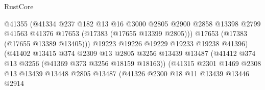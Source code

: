 \begin{lexlean}{RustCore}
\begin{coremodule}
                                            @41355
                                            (@41334
                                              @237
                                              @182
                                              @13
                                              @16
                                              @3000
                                              @2805
                                              @2900
                                              @2858
                                              @13398
                                              @2799
                                              @41563
                                              @41376
                                              @17653
                                              (@17383 (@17655 @13399 @2805)))
                                            @17653
                                            (@17383 (@17655 @13389 @13405)))
                                          @19223
                                          @19226
                                          @19229
                                          @19233
                                          @19238
                                          @41396)
                                        (@41402
                                          @13415
                                          @374
                                          @2309
                                          @13
                                          @2805
                                          @3256
                                          @13439
                                          @13487
                                          (@41412 @374 @13 @3256 (@41369 @373 @3256 @18159 @18163))
                                          (@41315
                                            @2301
                                            @1469
                                            @2308
                                            @13
                                            @13439
                                            @13448
                                            @2805
                                            @13487
                                            (@41326
                                              @2300
                                              @18
                                              @11
                                              @13439
                                              @13446
                                              @2914

\end{coremodule}
\end{lexlean}
